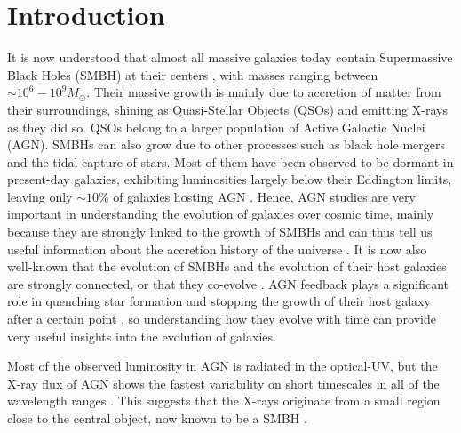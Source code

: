 \documentclass[fleqn,usenatbib]{mnras}
\begin{document}
\section{Introduction}\label{sec:intro}

It is now understood that almost all massive galaxies today contain Supermassive Black Holes (SMBH) at their centers \citep{kormendy2013smbh}, with masses ranging between $\sim 10^6 - 10^9 M_{\odot}$. 
Their massive growth is mainly due to accretion of matter from their surroundings, shining as Quasi-Stellar Objects (QSOs) and emitting X-rays as they did so. 
QSOs belong to a larger population of Active Galactic Nuclei (AGN). 
SMBHs can also grow due to other processes such as black hole mergers and the tidal capture of stars. 
Most of them have been observed to be dormant in present-day galaxies, exhibiting luminosities largely below their Eddington limits, leaving only $\sim 10\%$ of galaxies hosting AGN \citep{ho2008nuclear}. 
Hence, AGN studies are very important in understanding the evolution of galaxies over cosmic time, mainly because they are strongly linked to the growth of SMBHs and can thus tell us useful information about the accretion history of the universe \citep{brandt2015cosmic}. 
It is now also well-known that the evolution of SMBHs and the evolution of their host galaxies are strongly connected, or that they co-evolve \citep{symeonidis2013agn}. 
AGN feedback plays a significant role in quenching star formation and stopping the growth of their host galaxy after a certain point \citep{bongiorno2016agnfeedback}, so understanding how they evolve with time can provide very useful insights into the evolution of galaxies.

Most of the observed luminosity in AGN is radiated in the optical-UV, but the X-ray flux of AGN shows the fastest variability on short timescales in all of the wavelength ranges \citep{netzer2013physics}. 
This suggests that the X-rays originate from a small region close to the central object, now known to be a SMBH \citep{mushotzky1993x}. 
\end{document}
